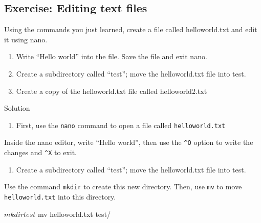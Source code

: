 \documentclass[
]{book}
\newenvironment{Shaded}{\begin{snugshade}}{\end{snugshade}}
\newcommand{\ExtensionTok}[1]{#1}
\newcommand{\NormalTok}[1]{#1}
\providecommand{\tightlist}{%
  \setlength{\itemsep}{0pt}\setlength{\parskip}{0pt}}
\begin{document}
\subsection{Exercise: Editing text files}\label{exercise-editing-text-files}

Using the commands you just learned, create a file called helloworld.txt and edit it using nano.

\begin{enumerate}
\def\labelenumi{\arabic{enumi}.}
\tightlist
\item
  Write ``Hello world'' into the file. Save the file and exit nano.
\item
  Create a subdirectory called ``test''; move the helloworld.txt file into test.
\item
  Create a copy of the helloworld.txt file called helloworld2.txt
\end{enumerate}

Solution

\begin{enumerate}
\def\labelenumi{\arabic{enumi}.}
\tightlist
\item
  First, use the \texttt{nano} command to open a file called \texttt{helloworld.txt}
\end{enumerate}

\begin{Shaded}
\end{Shaded}

Inside the nano editor, write ``Hello world'', then use the \texttt{\^{}O} option to write the changes and \texttt{\^{}X} to exit.

\begin{enumerate}
\def\labelenumi{\arabic{enumi}.}
\setcounter{enumi}{1}
\tightlist
\item
  Create a subdirectory called ``test''; move the helloworld.txt file into test.
\end{enumerate}

Use the command \texttt{mkdir} to create this new directory. Then, use \texttt{mv} to move \texttt{helloworld.txt} into this directory.

\begin{Shaded}
\begin{Highlighting}[]
\ExtensionTok{$}\NormalTok{ mkdir test}
\ExtensionTok{$}\NormalTok{ mv helloworld.txt test/}
\end{Highlighting}
\end{Shaded}
\end{document}
